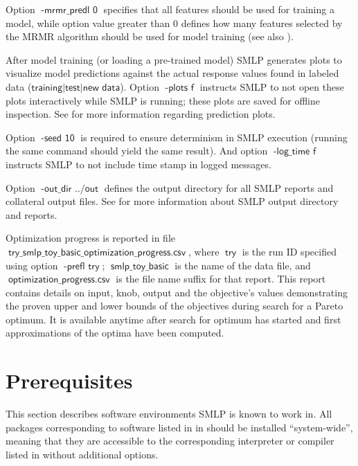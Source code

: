 \documentclass[a4paper,parskip=half]{article} %
\newcommand*\option[1]{\operatorname{\mathsf{#1}}} %
\newcommand*\optionval[2]{\operatorname{\mathsf{#1}\,\,\mathsf{#2}}} %
\newcommand*\suffix[1]{\operatorname{\mathsf{#1}}} %
\newcommand*\SolverAbbrvText{SMLP}
\newcommand*\SolverAbbrv{\SolverAbbrvText\xspace}
\begin{document}
Option $\optionval{-mrmr\_predl}{0}$ specifies that all features should be used for training a model, while option
value greater than $0$ defines how many features selected by the MRMR algorithm should be used for model training 
(see also ).

After model training (or loading a pre-trained model) SMLP generates plots to visualize model predictions 
against the actual response values found in labeled data ($\option{training|test|new\,\,data}$). 
 Option $\optionval{-plots}{f}$ instructs SMLP to not open these plots interactively while SMLP is running;
these plots are saved for offline inspection. See  for more information regarding prediction plots.

Option $\optionval{-seed}{10}$ is required to ensure determinism in SMLP execution (running the same command 
should yield the same result). And option $\optionval{-log\_time}{f}$ instructs SMLP to not include time stamp in
logged messages.

Option $\optionval{-out\_dir}{../out}$ defines the output directory for all SMLP reports and collateral output files.
See  for more information about SMLP output directory and reports. 

Optimization progress is reported in file $\suffix{try\_smlp\_toy\_basic\_optimization\_progress.csv}$, 
where $\option{try}$ is the run ID specified using option $\optionval{-prefl}{try}$; $\suffix{smlp\_toy\_basic}$ 
is the name of the data file, and $\suffix{optimization\_progress.csv}$ is the file name suffix for that report. 
This report contains details on input, knob, output and the objective's values demonstrating the proven 
upper and lower bounds of the objectives during search for a Pareto optimum. It is available anytime
after search for optimum has started and first approximations of the optima have been computed.






\section{Prerequisites}
This section describes software environments \SolverAbbrv is known to work in.
All packages corresponding to software listed in in  should be
installed ``system-wide'',
meaning that they are accessible to the corresponding interpreter or compiler
listed in  without additional options.
\end{document}

